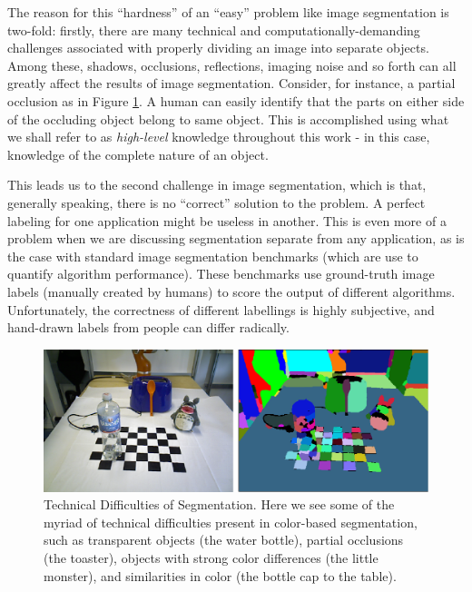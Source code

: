 The reason for this ``hardness'' of an ``easy'' problem like image segmentation is two-fold: firstly, there are many technical and computationally-demanding challenges associated with properly dividing an image into separate objects. Among these, shadows, occlusions, reflections, imaging noise and so forth can all greatly affect the results of image segmentation. Consider, for instance, a partial occlusion as in Figure \ref{fig:SegmentationProblems}. A human can easily identify that the parts on either side of the occluding object belong to same object. This is accomplished using what we shall refer to as \emph{high-level} knowledge throughout this work - in this case, knowledge of the complete nature of an object.

This leads us to the second challenge in image segmentation, which is that, generally speaking, there is no ``correct'' solution to the problem. A perfect labeling for one application might be useless in another. This is even more of a problem when we are discussing segmentation separate from any application, as is the case with standard image segmentation benchmarks (which are use to quantify algorithm performance). These benchmarks use ground-truth image labels (manually created by humans) to score the output of different algorithms. Unfortunately, the correctness of different labellings is highly subjective, and hand-drawn labels from  people can differ radically.

\begin{figure}
\label{fig:SegmentationProblems}
\centering
\includegraphics[width=\linewidth]{figures/Introduction/Segmentation_Problems.pdf}
\caption[Technical Difficulties of Segmentation]{Technical Difficulties of Segmentation. Here we see some of the myriad of technical difficulties present in color-based segmentation, such as transparent objects (the water bottle), partial occlusions (the toaster), objects with strong color differences (the little monster), and similarities in color (the bottle cap to the table).}
\end{figure}


